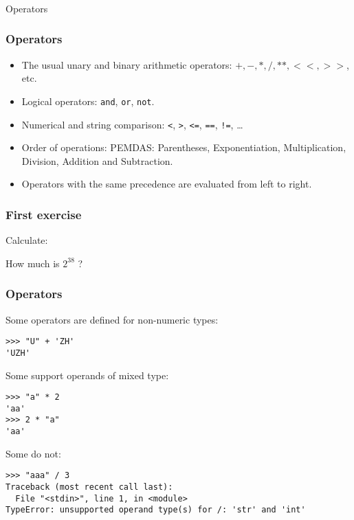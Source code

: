 \begin{frame}[fragile]\frametitle{}
\begin{center}
{\Large Operators}
\end{center}
\end{frame}

\begin{frame}[fragile]\frametitle{Operators}
\begin{itemize}
\item The usual unary and binary arithmetic operators: $+,-,*,/,**,<<,>>$, etc.
\item Logical operators: \texttt{and}, \texttt{or}, \texttt{not}.
\item Numerical and string comparison: \texttt{<}, \texttt{>}, \texttt{<=}, \texttt{==}, \texttt{!=}, \ldots
\item Order of operations: PEMDAS: Parentheses, Exponentiation,  Multiplication, Division, Addition and Subtraction.
\item  Operators with the same precedence are evaluated from left to right.
\end{itemize}
\end{frame}

\begin{frame}[fragile] \frametitle{First exercise}
Calculate:
  \begin{center}
    {\Large How much is \href{http://www.pythonchallenge.com}{$2^{38}$} ?}
  \end{center}

\end{frame}

\begin{frame}[fragile]\frametitle{Operators}
  Some operators are defined for non-numeric types:
\begin{lstlisting}
>>> "U" + 'ZH'
'UZH'
\end{lstlisting}

  
  Some support operands of mixed type:
\begin{lstlisting}
>>> "a" * 2
'aa'
>>> 2 * "a"
'aa'
\end{lstlisting}

  
  Some do not:
\begin{lstlisting}[basicstyle=\footnotesize\ttfamily]
>>> "aaa" / 3
Traceback (most recent call last):
  File "<stdin>", line 1, in <module>
TypeError: unsupported operand type(s) for /: 'str' and 'int'
\end{lstlisting}
\end{frame}

